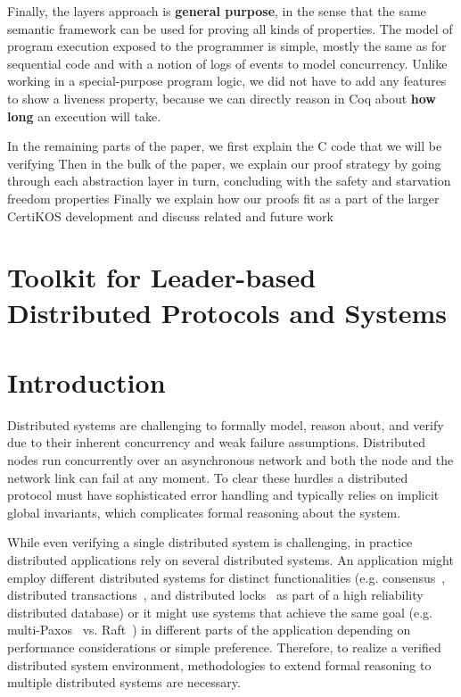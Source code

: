{Finally, the layers approach is {\bf general purpose}, in the sense
that the same semantic framework can be used for proving all kinds of
properties. The model of program execution exposed to the programmer
is simple, mostly the same as for sequential code and with a notion of logs of events to model concurrency.
Unlike working in a special-purpose program logic, we 
did not have to add any features to show a liveness property, because we can directly reason in Coq about \textbf{how long} an execution will take. 

In the remaining parts of the paper, we first explain the C code that we will be verifying 
Then in the bulk of the paper, we explain our proof strategy by going through each abstraction layer in turn, concluding with the safety and starvation freedom properties Finally we explain how our proofs fit as a part of the larger CertiKOS development and discuss related and future work



\section{Toolkit for Leader-based Distributed Protocols and Systems}
\label{chapter:introduction:sec:toolkit-for-leader-based-distributed-protocols-and-systems}

\section{Introduction}
\label{sec:intro}


Distributed systems are challenging to formally model, reason about, and verify
due to their inherent concurrency and weak failure assumptions. Distributed
nodes run concurrently over an asynchronous network and both the node and the
network link can fail at any moment. To clear these hurdles a distributed
protocol must have sophisticated error handling and typically relies on implicit
global invariants, which complicates formal reasoning about the system.


While even verifying a single distributed system is challenging, in practice
distributed applications rely on several distributed systems. An application
might employ different distributed systems for distinct functionalities (e.g.
consensus~\cite{vivaladifference}, distributed transactions~\cite{gray:2006},
and distributed locks~\cite{chubby, zookeeper} as part of a high reliability
distributed database) or it might use systems that achieve the same goal (e.g.
multi-Paxos~\cite{paxosmadesimple, rvrpaxos} vs. Raft~\cite{raft}) in different
parts of the application depending on performance considerations or simple
preference. Therefore, to realize a verified distributed system environment,
methodologies to extend formal reasoning to multiple distributed systems are
necessary.


}
